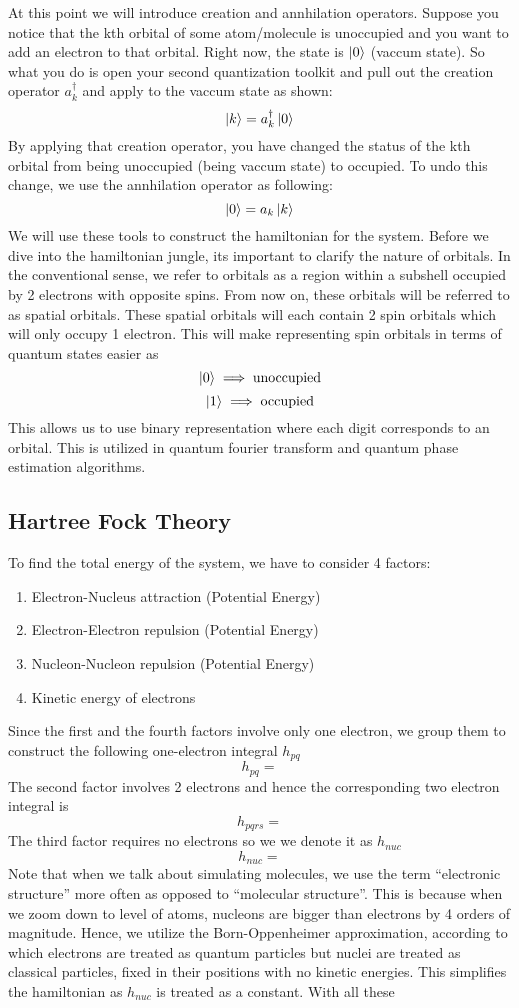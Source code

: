 \documentclass{article}
\begin{document}
At this point we will introduce creation and annhilation operators. Suppose
you notice that the kth orbital of some atom/molecule is unoccupied and you want
to add an electron to that orbital. Right now, the state is
\(\ket{0}\) (vaccum state). So what you do is open your second quantization
toolkit and pull out the creation operator \(a^{\dagger}_k\) and apply to the
vaccum state as shown:
\[\ket{k} = a^{\dagger}_k\ket{0}\]
By applying that creation operator, you have changed the status of the kth
orbital from being unoccupied (being vaccum state) to occupied. To undo this
change, we use the annhilation operator as following:
\[\ket{0} = a_k\ket{k}\]
We will use these tools to construct the hamiltonian for the system. Before we
dive into the hamiltonian jungle, its important to clarify the nature of
orbitals. In the conventional sense, we refer to orbitals as a region within
a subshell occupied by 2 electrons with opposite spins. From now on, these
orbitals will be referred to as spatial orbitals. These spatial orbitals will
each contain 2 spin orbitals which will only occupy 1 electron. This will make
representing spin orbitals in terms of quantum states easier as
\[\ket{0} \implies \text{unoccupied}\]
\[\ket{1} \implies \text{occupied}\]
This allows us to use binary representation where each digit corresponds to
an orbital. This is utilized in quantum fourier transform and quantum phase
estimation algorithms.
\subsection{Hartree Fock Theory}

To find the total energy of the system, we have to consider 4 factors:
\begin{enumerate}
  \item Electron-Nucleus attraction (Potential Energy)
  \item Electron-Electron repulsion (Potential Energy)
  \item Nucleon-Nucleon repulsion (Potential Energy)
  \item Kinetic energy of electrons
\end{enumerate}
Since the first and the fourth factors involve only one electron, we group
them to construct the following one-electron integral \(h_{pq}\)
\[h_{pq} = \]
The second factor involves 2 electrons and hence the corresponding two
electron integral is
\[h_{pqrs} =\]
The third factor requires no electrons so we we denote it as \(h_{nuc}\)
\[h_{nuc} =\]
Note that when we talk about simulating molecules, we use the term ``electronic
structure'' more often as opposed to ``molecular structure''. This is because
when we zoom down to level of atoms, nucleons are bigger than electrons by
4 orders of magnitude. Hence, we utilize the Born-Oppenheimer approximation,
according to which electrons are treated as quantum particles but nuclei are
treated as classical particles, fixed in their positions with no kinetic
energies. This simplifies the hamiltonian as \(h_{nuc}\) is treated as a constant.
With all these
\end{document}

